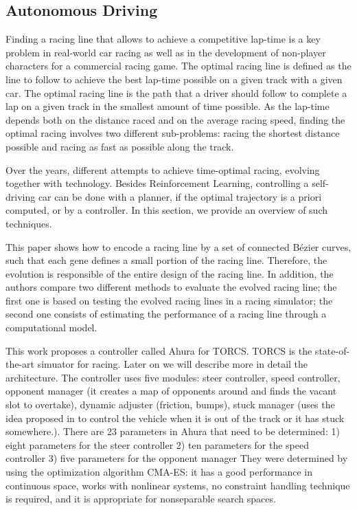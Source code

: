 \subsection{Autonomous Driving}
Finding a racing line that allows to achieve a competitive lap-time is a key problem in real-world car racing as well as in the development of non-player characters for a commercial racing game.
The optimal racing line is defined as the line to follow to achieve the best lap-time possible on a given track with a given car. The optimal racing line is the path that a driver should follow to complete a lap on a given track in the smallest amount of time possible. As the lap-time depends both on the distance raced and on the average racing speed, finding the optimal racing involves two different sub-problems: racing the shortest distance possible and racing as fast
as possible along the track.

Over the years, different attempts to achieve time-optimal racing, evolving together with technology. Besides Reinforcement Learning, controlling a self-driving car can be done with a planner, if the optimal trajectory is a priori computed, or by a controller. In this section, we provide an overview of such techniques. 


This paper \cite{botta} shows how to encode a racing line by a set of connected Bézier curves, such that each gene defines a small portion of the racing line. Therefore, the evolution is responsible of the entire design of the racing line. In addition, the authors compare two different methods to evaluate the evolved racing line; the first one is based on testing the evolved racing lines in a racing simulator; the second one consists of estimating the performance of a racing line through a computational model.
	
This work \cite{ahura} proposes a controller called Ahura for TORCS. 
TORCS is the state-of-the-art simuator for racing. Later on we will describe more in detail the architecture.
The controller uses five modules: steer controller, speed controller, opponent manager (it creates a map of opponents around  and finds the vacant slot to overtake), dynamic adjuster (friction, bumps), stuck manager (uses the idea proposed in to control the vehicle when it is out of the track or it has stuck somewhere.).
There are 23 parameters in Ahura that need to be determined:
1) eight parameters for the steer controller 
2) ten parameters for the speed controller 
3) five parameters for the opponent manager
They were determined by using the optimization algorithm CMA-ES: it has a good performance in continuous space, works with nonlinear systems, no constraint handling technique is required, and it is appropriate for nonseparable search spaces.


